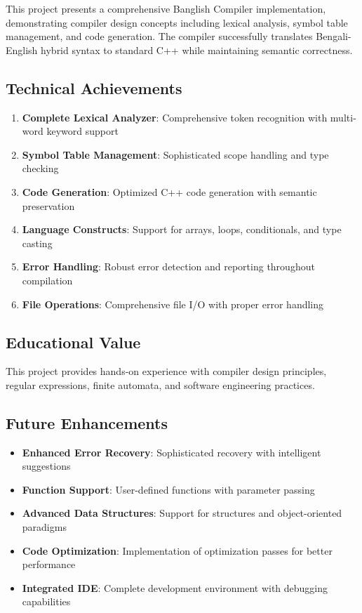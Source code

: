 \documentclass[12pt,a4paper]{article}
\begin{document}
This project presents a comprehensive Banglish Compiler implementation, demonstrating compiler design concepts including lexical analysis, symbol table management, and code generation. The compiler successfully translates Bengali-English hybrid syntax to standard C++ while maintaining semantic correctness.

\subsection{Technical Achievements}

\begin{enumerate}[leftmargin=*,itemsep=3pt]
    \item \textbf{Complete Lexical Analyzer}: Comprehensive token recognition with multi-word keyword support
    \item \textbf{Symbol Table Management}: Sophisticated scope handling and type checking
    \item \textbf{Code Generation}: Optimized C++ code generation with semantic preservation
    \item \textbf{Language Constructs}: Support for arrays, loops, conditionals, and type casting
    \item \textbf{Error Handling}: Robust error detection and reporting throughout compilation
    \item \textbf{File Operations}: Comprehensive file I/O with proper error handling
\end{enumerate}

\subsection{Educational Value}

This project provides hands-on experience with compiler design principles, regular expressions, finite automata, and software engineering practices.

\subsection{Future Enhancements}

\begin{itemize}[leftmargin=*,itemsep=3pt]
    \item \textbf{Enhanced Error Recovery}: Sophisticated recovery with intelligent suggestions
    \item \textbf{Function Support}: User-defined functions with parameter passing
    \item \textbf{Advanced Data Structures}: Support for structures and object-oriented paradigms
    \item \textbf{Code Optimization}: Implementation of optimization passes for better performance
    \item \textbf{Integrated IDE}: Complete development environment with debugging capabilities
\end{itemize}
\end{document}

